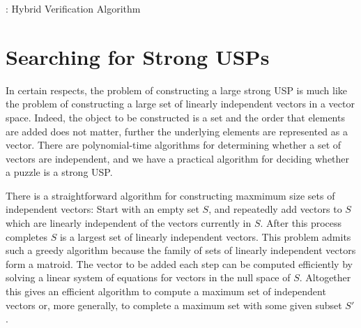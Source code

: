 \documentclass[11pt]{article}
\begin{document}
\begin{algorithm}[t]
  \caption{: Hybrid Verification Algorithm}
  \label{alg:hybrid}
\begin{algorithmic}[1]
    \EndIf
    \EndIf
    \EndIf
  \EndFunction
\end{algorithmic}
\end{algorithm}

\section{Searching for Strong USPs}
\label{sec:search}

In certain respects, the problem of constructing a large strong USP is
much like the problem of constructing a large set of linearly
independent vectors in a vector space.  Indeed, the object to be
constructed is a set and the order that elements are added does not
matter, further the underlying elements are represented as a vector.
There are polynomial-time algorithms for determining whether a set of
vectors are independent, and we have a practical algorithm for
deciding whether a puzzle is a strong USP.

There is a straightforward algorithm for constructing maxmimum size
sets of independent vectors: Start with an empty set $S$, and
repeatedly add vectors to $S$ which are linearly independent of the
vectors currently in $S$.  After this process completes $S$ is a
largest set of linearly independent vectors.  This problem admits such
a greedy algorithm because the family of sets of linearly independent
vectors form a matroid.  The vector to be added each step can be
computed efficiently by solving a linear system of equations for
vectors in the null space of $S$.  Altogether this gives an efficient
algorithm to compute a maximum set of independent vectors or, more
generally, to complete a maximum set with some given subset $S'$.
\end{document}

